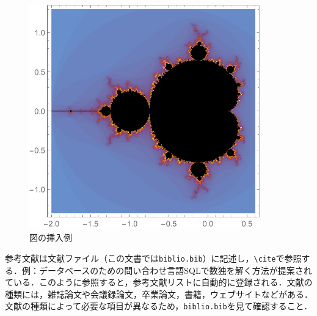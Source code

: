 \begin{figure}[htb]
\centering
\includegraphics[width=10cm]{figure.pdf}
\caption{図の挿入例}\label{サンプル図}
\end{figure}

参考文献は文献ファイル（この文書では\verb|biblio.bib|）に記述し，\verb|\cite|で参照する．例：データベースのための問い合わせ言語SQLで数独を解く方法が提案されている\cite{yabuki2011}．このように参照すると，参考文献リストに自動的に登録される．文献の種類には，雑誌論文\cite{yabuki2011}や会議録論文\cite{yabuki2013}，卒業論文\cite{kubo2014}，書籍\cite{okumura2013}，ウェブサイト\cite{self}などがある．文献の種類によって必要な項目が異なるため，\verb|biblio.bib|を見て確認すること．




